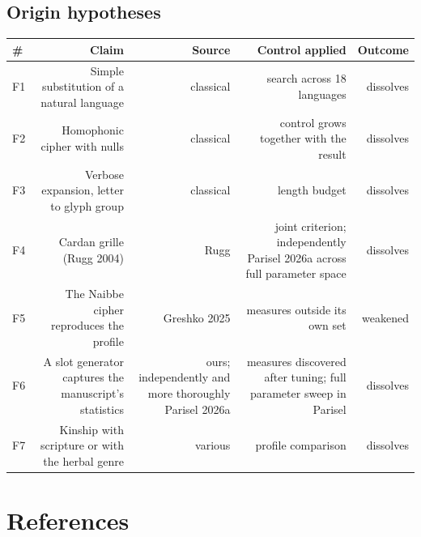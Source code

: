 \documentclass[11pt,a4paper]{article}
\begin{document}
\subsection*{Origin hypotheses}


\begin{table}[htbp]\centering\small
\begin{tabular}{@{}lrrrr@{}}
\toprule
\# & Claim & Source & Control applied & Outcome \\
\midrule
F1 & Simple substitution of a natural language & classical & search across 18 languages & dissolves \\
F2 & Homophonic cipher with nulls & classical & control grows together with the result & dissolves \\
F3 & Verbose expansion, letter to glyph group & classical & length budget & dissolves \\
F4 & Cardan grille (Rugg 2004) & Rugg & joint criterion; independently Parisel 2026a across full parameter space & dissolves \\
F5 & The Naibbe cipher reproduces the profile & Greshko 2025 & measures outside its own set & weakened \\
F6 & A slot generator captures the manuscript's statistics & ours; independently and more thoroughly Parisel 2026a & measures discovered after tuning; full parameter sweep in Parisel & dissolves \\
F7 & Kinship with scripture or with the herbal genre & various & profile comparison & dissolves \\
\bottomrule
\end{tabular}
\end{table}

\section*{References}
\end{document}
